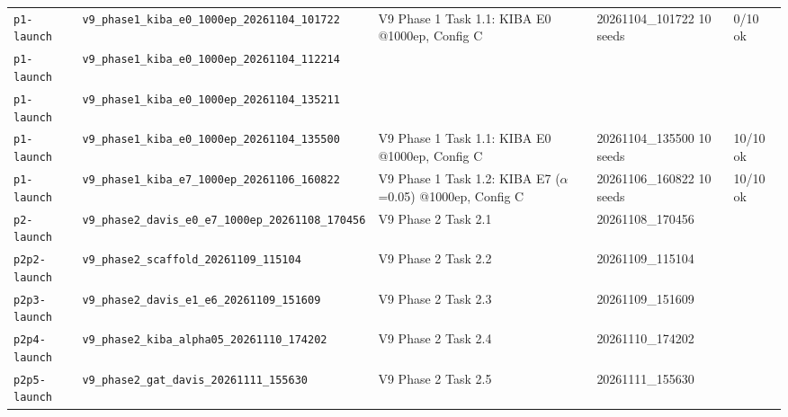 \begin{table}[!h]
{\begin{tabular}{p{2.4cm}p{5.0cm}p{4.2cm}p{3.2cm}p{2.0cm}}
\texttt{p1-launch} & \texttt{v9\_\allowbreak{}phase1\_\allowbreak{}kiba\_\allowbreak{}e0\_\allowbreak{}1000ep\_\allowbreak{}20261104\_\allowbreak{}101722} & V9 Phase 1 Task 1.1: KIBA E0 @1000ep, Config C & 20261104\_101722 10 seeds & 0/10 ok \\
\texttt{p1-launch} & \texttt{v9\_\allowbreak{}phase1\_\allowbreak{}kiba\_\allowbreak{}e0\_\allowbreak{}1000ep\_\allowbreak{}20261104\_\allowbreak{}112214} &  &   &  \\
\texttt{p1-launch} & \texttt{v9\_\allowbreak{}phase1\_\allowbreak{}kiba\_\allowbreak{}e0\_\allowbreak{}1000ep\_\allowbreak{}20261104\_\allowbreak{}135211} &  &   &  \\
\texttt{p1-launch} & \texttt{v9\_\allowbreak{}phase1\_\allowbreak{}kiba\_\allowbreak{}e0\_\allowbreak{}1000ep\_\allowbreak{}20261104\_\allowbreak{}135500} & V9 Phase 1 Task 1.1: KIBA E0 @1000ep, Config C & 20261104\_135500 10 seeds & 10/10 ok \\
\texttt{p1-launch} & \texttt{v9\_\allowbreak{}phase1\_\allowbreak{}kiba\_\allowbreak{}e7\_\allowbreak{}1000ep\_\allowbreak{}20261106\_\allowbreak{}160822} & V9 Phase 1 Task 1.2: KIBA E7 ($\alpha$=0.05) @1000ep, Config C & 20261106\_160822 10 seeds & 10/10 ok \\
\texttt{p2-launch} & \texttt{v9\_\allowbreak{}phase2\_\allowbreak{}davis\_\allowbreak{}e0\_\allowbreak{}e7\_\allowbreak{}1000ep\_\allowbreak{}20261108\_\allowbreak{}170456} & V9 Phase 2 Task 2.1 & 20261108\_170456  &  \\
\texttt{p2p2-launch} & \texttt{v9\_\allowbreak{}phase2\_\allowbreak{}scaffold\_\allowbreak{}20261109\_\allowbreak{}115104} & V9 Phase 2 Task 2.2 & 20261109\_115104  &  \\
\texttt{p2p3-launch} & \texttt{v9\_\allowbreak{}phase2\_\allowbreak{}davis\_\allowbreak{}e1\_\allowbreak{}e6\_\allowbreak{}20261109\_\allowbreak{}151609} & V9 Phase 2 Task 2.3 & 20261109\_151609  &  \\
\texttt{p2p4-launch} & \texttt{v9\_\allowbreak{}phase2\_\allowbreak{}kiba\_\allowbreak{}alpha05\_\allowbreak{}20261110\_\allowbreak{}174202} & V9 Phase 2 Task 2.4 & 20261110\_174202  &  \\
\texttt{p2p5-launch} & \texttt{v9\_\allowbreak{}phase2\_\allowbreak{}gat\_\allowbreak{}davis\_\allowbreak{}20261111\_\allowbreak{}155630} & V9 Phase 2 Task 2.5 & 20261111\_155630  &  \\
\bottomrule
\end{tabular}%
}
\end{table}

